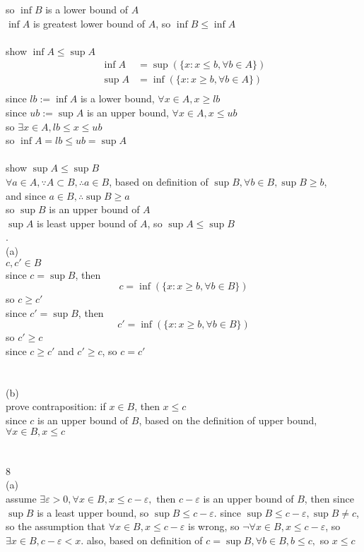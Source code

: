 \documentclass[12pt, border = 4pt, multi]{article} %
\begin{document}
so $\inf B$ is a lower bound of $A$\\
$\inf A$ is greatest lower bound of $A$, so $\inf B \leq \inf A$\\
\\
show $\inf A \leq \sup A$\\
\begin{align*}
\inf A &= \sup(\{x : x \leq b, \forall b \in A\})\\
\sup A &= \inf(\{x: x \geq b, \forall b \in A\})\\
\end{align*}
since $lb := \inf A$ is a lower bound, $\forall x \in A, x \geq lb$\\
since $ub := \sup A$ is an upper bound, $\forall x \in A, x \leq ub$\\
so $\exists x \in A, lb \leq x \leq ub$\\
so $\inf A = lb \leq ub = \sup A$\\
\\
show $\sup A \leq \sup B$\\
$\forall a \in A, \because A \subset B, \therefore a \in B$, based on definition of $\sup B, \forall b \in B, \sup B \geq b$,\\
and since $a \in B, \therefore \sup B \geq a$\\
so $\sup B$ is an upper bound of $A$\\
$\sup A$ is least upper bound of $A$, so $\sup A \leq \sup B$
\\
\newpage
{}.\\
(a)\\
$c, c' \in B$\\
since $c = \sup B$, then
\[c = \inf(\{x: x \geq b, \forall b \in B\})\]
so $c \geq c'$\\
since $c' = \sup B$, then
\[c' = \inf(\{x: x \geq b, \forall b \in B\})\]
so $c' \geq c$\\
since $c \geq c'$ and $c' \geq c$, so $c = c'$\\
\\
\\
(b)\\
prove contraposition: if $x \in B$, then $x \leq c$\\
since $c$ is an upper bound of $B$, based on the definition of upper bound, $\forall x \in B, x \leq c$\\
\\
\\
8\\
(a)\\
assume $\exists \varepsilon > 0, \forall x \in B, x \leq c - \varepsilon, \text{ then } c - \varepsilon$ is an upper bound of $B$, then since $\sup B$ is a least upper bound, so $\sup B \leq c - \varepsilon$. since $\sup B \leq c - \varepsilon, \sup B \not= c$, so the assumption that $\forall x \in B, x \leq c - \varepsilon$ is wrong, so $\neg\forall x \in B, x \leq c - \varepsilon$, so $\exists x \in B, c - \varepsilon < x$. also, based on definition of $c = \sup B, \forall b \in B, b \leq c, $ so $x \leq c$\\
\end{document}
